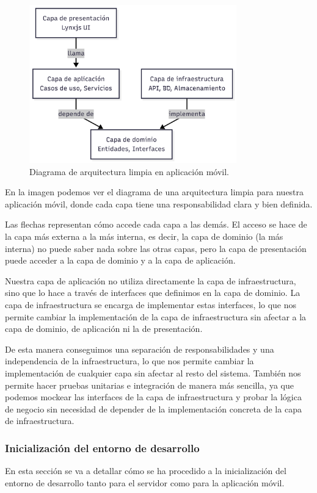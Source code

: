 \begin{figure}[H]
  \centering
  \includegraphics[width=0.8\textwidth]{assets/clean-architecture-mobile.png}
  \caption{Diagrama de arquitectura limpia en aplicación móvil.}
  \label{fig:clean-architecture-mobile}
\end{figure}

En la imagen podemos ver el diagrama de una arquitectura limpia para nuestra aplicación móvil, donde cada capa tiene una responsabilidad clara y bien definida.

Las flechas representan cómo accede cada capa a las demás.
El acceso se hace de la capa más externa a la más interna, es decir, la capa de dominio (la más interna) no puede saber nada sobre las otras capas, pero la capa de presentación puede acceder a la capa de dominio y a la capa de aplicación.

Nuestra capa de aplicación no utiliza directamente la capa de infraestructura, sino que lo hace a través de interfaces que definimos en la capa de dominio. La capa de infraestructura se encarga de implementar estas interfaces, lo que nos permite cambiar la implementación de la capa de infraestructura sin afectar a la capa de dominio, de aplicación ni la de presentación.

De esta manera conseguimos una separación de responsabilidades y una independencia de la infraestructura, lo que nos permite cambiar la implementación de cualquier capa sin afectar al resto del sistema.
También nos permite hacer pruebas unitarias e integración de manera más sencilla, ya que podemos \gls{mockear} las interfaces de la capa de infraestructura y probar la lógica de negocio sin necesidad de depender de la implementación concreta de la capa de infraestructura.

\subsubsection{Inicialización del entorno de desarrollo}
En esta sección se va a detallar cómo se ha procedido a la inicialización del entorno de desarrollo tanto para el servidor como para la aplicación móvil.
